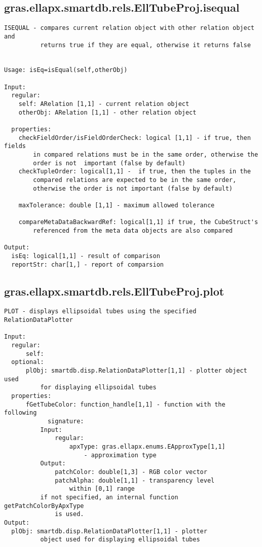 \subsection{\texorpdfstring{gras.ellapx.smartdb.rels.EllTubeProj.isequal}{isequal}}\label{method:gras.ellapx.smartdb.rels.EllTubeProj.isequal}
\begin{verbatim}
ISEQUAL - compares current relation object with other relation object and
          returns true if they are equal, otherwise it returns false


Usage: isEq=isEqual(self,otherObj)

Input:
  regular:
    self: ARelation [1,1] - current relation object
    otherObj: ARelation [1,1] - other relation object

  properties:
    checkFieldOrder/isFieldOrderCheck: logical [1,1] - if true, then fields
        in compared relations must be in the same order, otherwise the
        order is not  important (false by default)
    checkTupleOrder: logical[1,1] -  if true, then the tuples in the
        compared relations are expected to be in the same order,
        otherwise the order is not important (false by default)

    maxTolerance: double [1,1] - maximum allowed tolerance

    compareMetaDataBackwardRef: logical[1,1] if true, the CubeStruct's
        referenced from the meta data objects are also compared

Output:
  isEq: logical[1,1] - result of comparison
  reportStr: char[1,] - report of comparsion
\end{verbatim}
\subsection{\texorpdfstring{gras.ellapx.smartdb.rels.EllTubeProj.plot}{plot}}\label{method:gras.ellapx.smartdb.rels.EllTubeProj.plot}
\begin{verbatim}
PLOT - displays ellipsoidal tubes using the specified RelationDataPlotter

Input:
  regular:
      self:
  optional:
      plObj: smartdb.disp.RelationDataPlotter[1,1] - plotter object used
          for displaying ellipsoidal tubes
  properties:
      fGetTubeColor: function_handle[1,1] - function with the following
            signature:
          Input:
              regular:
                  apxType: gras.ellapx.enums.EApproxType[1,1]
                      - approximation type
          Output:
              patchColor: double[1,3] - RGB color vector
              patchAlpha: double[1,1] - transparency level
                  within [0,1] range
          if not specified, an internal function getPatchColorByApxType
              is used.
Output:
  plObj: smartdb.disp.RelationDataPlotter[1,1] - plotter
          object used for displaying ellipsoidal tubes
\end{verbatim}

